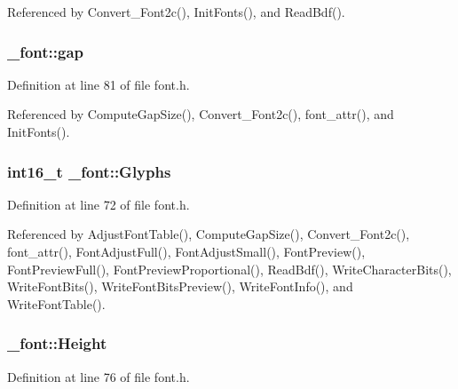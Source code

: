 Referenced by Convert\+\_\+\+Font2c(), Init\+Fonts(), and Read\+Bdf().

\subsubsection[{\texorpdfstring{gap}{gap}}]{ \+\_\+font\+::gap}\hypertarget{struct__font_af4d840b8e62f6a0548cef0a5474416f4}{}\label{struct__font_af4d840b8e62f6a0548cef0a5474416f4}


Definition at line 81 of file font.\+h.



Referenced by Compute\+Gap\+Size(), Convert\+\_\+\+Font2c(), font\+\_\+attr(), and Init\+Fonts().

\subsubsection[{\texorpdfstring{Glyphs}{Glyphs}}]{\setlength{\rightskip}{0pt plus 5cm}int16\+\_\+t \+\_\+font\+::\+Glyphs}\hypertarget{struct__font_a1e89c06fc11a730eb602522dc8953491}{}\label{struct__font_a1e89c06fc11a730eb602522dc8953491}


Definition at line 72 of file font.\+h.



Referenced by Adjust\+Font\+Table(), Compute\+Gap\+Size(), Convert\+\_\+\+Font2c(), font\+\_\+attr(), Font\+Adjust\+Full(), Font\+Adjust\+Small(), Font\+Preview(), Font\+Preview\+Full(), Font\+Preview\+Proportional(), Read\+Bdf(), Write\+Character\+Bits(), Write\+Font\+Bits(), Write\+Font\+Bits\+Preview(), Write\+Font\+Info(), and Write\+Font\+Table().

\subsubsection[{\texorpdfstring{Height}{Height}}]{ \+\_\+font\+::\+Height}\hypertarget{struct__font_a5888921d1a78bf917351a275e2033467}{}\label{struct__font_a5888921d1a78bf917351a275e2033467}


Definition at line 76 of file font.\+h.



